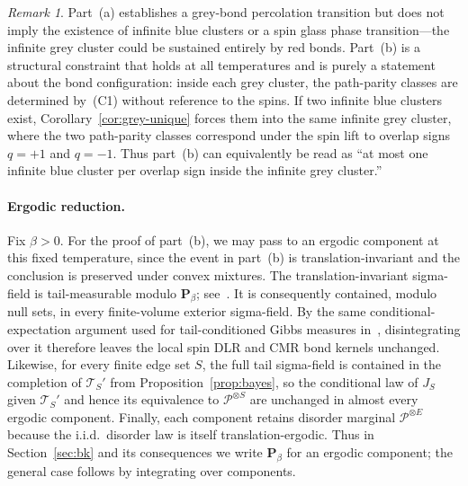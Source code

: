\documentclass[11pt]{article}
\numberwithin{theorem}{section}
\theoremstyle{remark}
\newtheorem{remark}[theorem]{Remark}
\begin{document}
\begin{remark}
Part~(a) establishes a grey-bond percolation transition but does not imply the existence of infinite blue clusters or a spin glass phase transition---the infinite grey cluster could be sustained entirely by red bonds.
Part~(b) is a structural constraint that holds at all temperatures and is purely a statement about the bond configuration: inside each grey cluster, the path-parity classes are determined by~(C1) without reference to the spins.
If two infinite blue clusters exist, Corollary~\ref{cor:grey-unique} forces them into the same infinite grey cluster, where the two path-parity classes correspond under the spin lift to overlap signs $q = +1$ and $q = -1$.
Thus part~(b) can equivalently be read as ``at most one infinite blue cluster per overlap sign inside the infinite grey cluster.''
\end{remark}

\paragraph{Ergodic reduction.}
Fix $\beta > 0$.
For the proof of part~\textup{(b)}, we may pass to an ergodic component at this fixed temperature, since the event in part~\textup{(b)} is translation-invariant and the conclusion is preserved under convex mixtures.
The translation-invariant sigma-field is tail-measurable modulo $\mathbf{P}_\beta$; see~\cite[Lemma~6.67]{FV2017}.
It is consequently contained, modulo null sets, in every finite-volume exterior sigma-field.
By the same conditional-expectation argument used for tail-conditioned Gibbs measures in~\cite[Proposition~6.69]{FV2017}, disintegrating over it therefore leaves the local spin DLR and CMR bond kernels unchanged.
Likewise, for every finite edge set $S$, the full tail sigma-field is contained in the completion of $\mathcal{T}_S'$ from Proposition~\ref{prop:bayes}, so the conditional law of $J_S$ given $\mathcal{T}_S'$ and hence its equivalence to $\mathscr{P}^{\otimes S}$ are unchanged in almost every ergodic component.
Finally, each component retains disorder marginal $\mathscr{P}^{\otimes E}$ because the i.i.d.\ disorder law is itself translation-ergodic.
Thus in Section~\ref{sec:bk} and its consequences we write $\mathbf{P}_\beta$ for an ergodic component; the general case follows by integrating over components.
\end{document}

